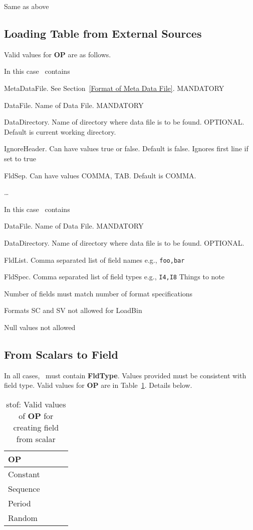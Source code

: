 \item [LoadBin] Same as above
\ed
\subsection{Loading Table from External Sources}
\label{load_tbl}

Valid values for {\bf OP} are as follows.
\bd
\item [LoadCSV] In this case \Args\ contains
\be
\item MetaDataFile. See Section~\ref{Format of Meta Data File}. MANDATORY
\item DataFile. Name of Data File. MANDATORY
\item DataDirectory. Name of directory where data file is to be found. OPTIONAL.
Default is current working directory.
\item IgnoreHeader. Can have values true or false. Default is false. Ignores
first line if set to true
\item FldSep. Can have values COMMA, TAB. Default is COMMA.
\item \ldots \TBC
\ee
\item [LoadBin] In this case \Args\ contains
\be
\item DataFile. Name of Data File. MANDATORY
\item DataDirectory. Name of directory where data file is to be found. OPTIONAL.
\item FldList. Comma separated list of field names e.g., {\tt foo,bar}
\item FldSpec. Comma separated list of field types e.g., {\tt I4,I8}
Things to note
\be
\item Number of fields must match number of format specifications
\item Formats SC and SV not allowed for LoadBin
\item Null values not allowed
\ee
\ee
\item [LoadHDFS] \TBC
\ed
\subsection{From Scalars to Field}
\label{s_to_f}
In all cases, \Args\ must contain {\bf FldType}. Values provided must be
consistent with field type. 
Valid values for {\bf OP} are in Table~\ref{tbl_s_to_f}. Details below. 
\begin{table}
\centering
\begin{tabular}{|l|l|l|l|} \hline \hline
{\bf OP} \\ \hline \hline
Constant \\ \hline
Sequence \\ \hline
Period \\ \hline
Random \\ \hline
\hline
\end{tabular}
\caption{stof: Valid values of {\bf OP} for creating field from scalar}
\label{tbl_s_to_f}
\end{table}


